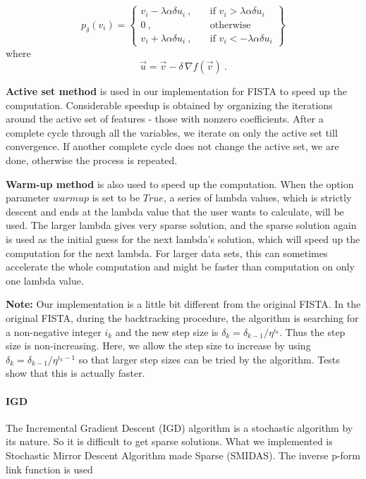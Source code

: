 \begin{equation}
p_\delta (v_i) = \left\{ \begin{array}{ll}
v_i - \lambda\alpha\delta u_i\ , \quad  & \mbox{if } v_i > \lambda\alpha\delta
u_i \\
0\ , \quad & \mbox{otherwise} \\
v_i + \lambda\alpha\delta u_i\ , \quad & \mbox{if } v_i < - \lambda\alpha\delta u_i
\end{array}
\right\}
\end{equation}
where
\begin{equation}
\vec{u} = \vec{v} - \delta\,\nabla f(\vec{v})\ .
\end{equation}

\textbf{Active set method} is used in our implementation for FISTA to speed up the
computation. Considerable speedup is obtained by organizing the iterations
around the active set of features - those with nonzero coefficients. After a
complete cycle through all the variables, we iterate on only the active set till
convergence. If another complete cycle does not change the active set, we are
done, otherwise the process is repeated.

\textbf{Warm-up method} is also used to speed up the computation. When the option
parameter $warmup$ is set to be $True$, a series of lambda values, which is
strictly descent and ends at the lambda value that the user wants to calculate,
will be used. The larger lambda gives very sparse solution, and the sparse
solution again is used as the initial guess for the next lambda's solution,
which will speed up the computation for the next lambda. For larger data sets,
this can sometimes accelerate the whole computation and might be faster than
computation on only one lambda value.

\textbf{Note:} Our implementation is a little bit different from the original
FISTA. In the original FISTA, during the backtracking procedure, the algorithm
is searching for a non-negative integer $i_k$ and the new step size is $\delta_k
= \delta_{k-1}/\eta^{i_k}$. Thus the step size is non-increasing. Here, we allow
the step size to increase by using $\delta_k = \delta_{k-1}/\eta^{i_k-1}$ so
that larger step sizes can be tried by the algorithm. Tests show that this is
actually faster.

\paragraph{IGD}

The Incremental Gradient Descent (IGD) algorithm is a stochastic algorithm by
its nature. So it is difficult to get sparse solutions. What we implemented is
Stochastic Mirror Descent Algorithm made Sparse (SMIDAS). The inverse p-form
link function is used

